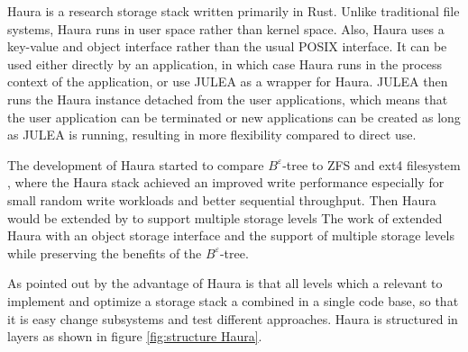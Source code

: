 \documentclass[
	12pt,
	a4paper,
	abstract,
	bibliography=totoc,
	chapterprefix,
	headings=openright,
	numbers=endperiod,
	parskip=half,
	twoside,
]{scrreprt}
\begin{document}
Haura is a research storage stack written primarily in Rust.
Unlike traditional file systems, Haura runs in user space rather than kernel space.
Also, Haura uses a key-value and object interface rather than the usual POSIX interface.
It can be used either directly by an application, in which case Haura runs in the process context of the application, or
use JULEA as a wrapper for Haura.
JULEA then runs the Haura instance detached from the user applications, which means that the user application can be terminated or new applications can be created as long as JULEA is running, resulting in more flexibility compared to direct use.


The development of Haura started to compare $B^{\varepsilon}$-tree to ZFS and ext4 filesystem \cite{wiedemann2018modern}, where the Haura stack
achieved an improved write performance especially for small random write workloads and better sequential throughput.
Then Haura would be extended by \cite{hoppner2021design} to support multiple storage levels
The work of \cite{hoppner2021design} extended Haura with an object storage interface and the support of multiple storage levels while preserving the benefits of the $B^{\varepsilon}$-tree.

As pointed out by \cite{wunsche2022data} the advantage of Haura is that all levels which a relevant to implement and optimize a storage stack a combined in a single code base, so that it is easy change subsystems and test different approaches.
Haura is structured in layers as shown in figure \ref{fig:structure Haura}.
\end{document}
